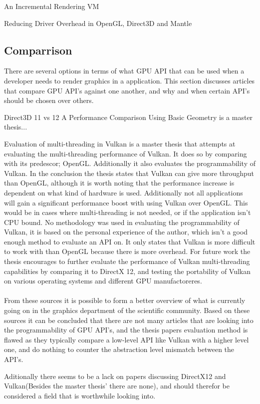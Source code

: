 An Incremental Rendering VM \cite{haaser_2015_incremental} 

Reducing Driver Overhead in OpenGL, Direct3D and Mantle  \cite{dobersberger_2015_reducing}

\subsection{Comparrison}
There are several options in terms of what \gls{GPU} \gls{API} that can be used when a developer needs to render graphics in a application. This section discusses articles that compare \gls{GPU} \gls{API}'s against one another, and why and when certain \gls{API}'s should be chosen over others.

Direct3D 11 vs 12 A Performance Comparison Using Basic Geometry \cite{2016_direct3d} is a master thesis...


Evaluation of multi-threading in Vulkan \cite{blackert_2016_evaluation} is a master thesis that attempts at evaluating the multi-threading performance of Vulkan. It does so by comparing with its predescor; OpenGL. 
Additionally it also evaluates the programmability of Vulkan. 
In the conclusion the thesis states that Vulkan can give more throughput than OpenGL, although it is worth noting that the performance increase is dependent on what kind of hardware is used. Additionally not all applications will gain a significant performance boost with using Vulkan over OpenGL. 
This would be in cases where multi-threading is not needed, or if the application isn't CPU bound. No methodology was used in evaluating the programmability of Vulkan, it is based on the personal experience of the author, which isn't a good enough method to evaluate an \gls{API} on. 
It only states that Vulkan is more difficult to work with than OpenGL because there is more overhead. 
For future work the thesis encourages to further evaluate the performance of Vulkan multi-threading  capabilities by comparing it to DirectX 12, and testing the portability of Vulkan on various operating systems and different \gls{GPU} manufactoreres.

\paragraph{}
From these sources it is possible to form a better overview of what is currently going on in the graphics department of the scientific community. Based on these sources it can be concluded that there are not many articles that are looking into the programmability of \gls{GPU} \gls{API}'s, and the thesis papers evaluation method is flawed as they typically compare a low-level \gls{API} like Vulkan with a higher level one, and do nothing to counter the abstraction level mismatch between the \gls{API}'s.

Aditionally there seems to be a lack on papers discussing DirectX12 and Vulkan(Besides the master thesis' there are none), and should therefor be considered a field that is worthwhile looking into.